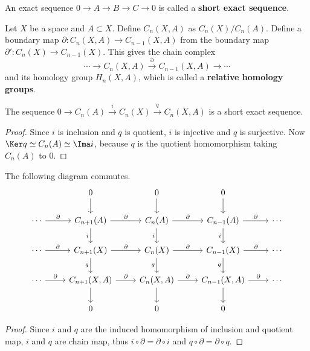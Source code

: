 \begin{defn} An exact sequence $0\rightarrow A\rightarrow B\rightarrow C\rightarrow 0$ is called a \textbf{short exact sequence}.
\end{defn}

\begin{defn} Let $X$ be a space and $A\subset X$. Define $C_n(X,A)$ as $C_n(X)/C_n(A)$. Define a boundary map $\partial:C_n(X,A)\rightarrow C_{n-1}(X,A)$ from the boundary map $\partial':C_n(X)\rightarrow C_{n-1}(X)$. This gives the chain complex
\begin{equation}
\cdots\rightarrow C_n(X,A)\xrightarrow{\partial} C_{n-1}(X,A)\rightarrow \cdots
\end{equation}
and its homology group $H_n(X,A)$, which is called a \textbf{relative homology groups}.
\end{defn}

\begin{prop} The sequence $0\rightarrow C_n(A)\xrightarrow{i} C_n(X)\xrightarrow{q} C_n(X,A)$ is a short exact sequence.
\end{prop}
\begin{proof}
Since $i$ is inclusion and $q$ is quotient, $i$ is injective and $q$ is surjective. Now $\Ker q\simeq C_n(A)\simeq \Ima i$, because $q$ is the quotient homomorphism taking $C_n(A)$ to $0$.
\end{proof}

\begin{prop} The following diagram commutes.
\begin{equation}
\begin{tikzcd}
&0\arrow{d}&0\arrow{d}&0\arrow{d}&\\
\cdots\arrow{r}{\partial}&C_{n+1}(A)\arrow{r}{\partial}\arrow[swap]{d}{i}&C_{n}(A)\arrow{r}{\partial}\arrow[swap]{d}{i}&C_{n-1}(A)\arrow{r}{\partial}\arrow[swap]{d}{i}&\cdots\\
\cdots\arrow{r}{\partial}&C_{n+1}(X)\arrow{r}{\partial}\arrow[swap]{d}{q}&C_{n}(X)\arrow{r}{\partial}\arrow[swap]{d}{q}&C_{n-1}(X)\arrow{r}{\partial}\arrow[swap]{d}{q}&\cdots\\
\cdots\arrow{r}{\partial}&C_{n+1}(X,A)\arrow{r}{\partial}\arrow[swap]{d}&C_{n}(X,A)\arrow{r}{\partial}\arrow[swap]{d}&C_{n-1}(X,A)\arrow{r}{\partial}\arrow[swap]{d}&\cdots\\
&0&0&0&
\end{tikzcd}
\end{equation}
\end{prop}
\begin{proof}
Since $i$ and $q$ are the induced homomorphism of inclusion and quotient map, $i$ and $q$ are chain map, thus $i\circ \partial=\partial\circ i$ and $q\circ \partial=\partial\circ q$.
\end{proof}

